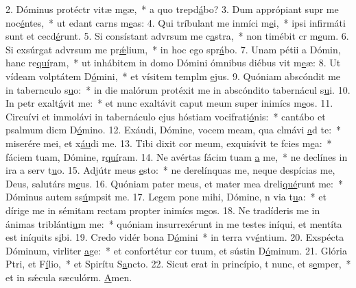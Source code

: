 2. Dóminus protéctr vitæ m\uline{e}æ,~* a quo trepd\uline{á}bo?
3. Dum apprópiant supr me noc\uline{é}ntes,~* ut edant carns m\uline{e}as:
4. Qui tríbulant me inmíci m\uline{e}i,~* ipsi infirmáti sunt et cecd\uline{é}runt.
5. Si consístant advrsum me c\uline{a}stra,~* non timébit cr m\uline{e}um.
6. Si exsúrgat advrsum me pr\uline{ǽ}lium,~* in hoc ego spr\uline{á}bo.
7. Unam pétii a Dómin, hanc re\uline{quí}ram,~* ut inhábitem in domo Dómini ómnibus diébus vit m\uline{e}æ:
8. Ut vídeam volptátem D\uline{ó}mini,~* et vísitem templm \uline{e}jus.
9. Quóniam abscóndit me in tabernculo s\uline{u}o:~* in die malórum protéxit me in abscóndito tabernácul s\uline{u}i.
10. In petr exalt\uline{á}vit me:~* et nunc exaltávit caput meum super inimícs m\uline{e}os.
11. Circuívi et immolávi in tabernáculo ejus hóstiam vocifrati\uline{ó}nis:~* cantábo et psalmum dicm D\uline{ó}mino.
12. Exáudi, Dómine, vocem meam, qua clmávi \uline{a}d te:~* miserére mei, et x\uline{áu}di me.
13. Tibi dixit cor meum, exquisívit te fcies m\uline{e}a:~* fáciem tuam, Dómine, r\uline{quí}ram.
14. Ne avértas fácim tuam \uline{a} me,~* ne declínes in ira a serv t\uline{u}o.
15. Adjútr meus \uline{e}sto:~* ne derelínquas me, neque despícias me, Deus, salutárs m\uline{e}us.
16. Quóniam pater meus, et mater mea dreli\uline{qué}runt me:~* Dóminus autem ss\uline{ú}mpsit me.
17. Legem pone mihi, Dómine, n via t\uline{u}a:~* et dírige me in sémitam rectam propter inimícs m\uline{e}os.
18. Ne tradíderis me in ánimas triblánti\uline{u}m me:~* quóniam insurrexérunt in me testes iníqui, et mentíta est iníquits s\uline{i}bi.
19. Credo vidér bona D\uline{ó}mini~* in terra vv\uline{é}ntium.
20. Exspécta Dóminum, virliter \uline{a}ge:~* et confortétur cor tuum, et sústin D\uline{ó}minum.
21. Glória Ptri, et F\uline{í}lio,~* et Spirítu S\uline{a}ncto.
22. Sicut erat in princípio, t nunc, et s\uline{e}mper,~* et in sǽcula sæculórm. \uline{A}men.
